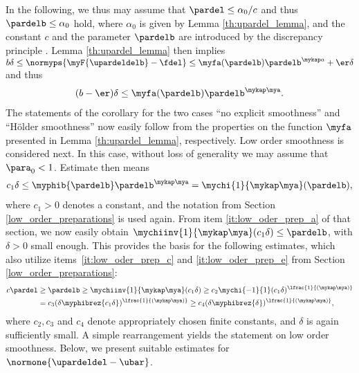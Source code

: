 \documentclass[10pt]{article}
\theoremstyle{definition}
\begin{document}
In the following, we thus may assume that $ \pardel \le \alpha_0/c $
and thus $ \pardelb \le \alpha_0 $ hold, where
$ \alpha_0 $ is given by Lemma \ref{th:upardel_lemma}, and
the constant $ c $ and the parameter $ \pardelb $ are introduced by the discrepancy principle .
Lemma \ref{th:upardel_lemma} then implies
$ b \delta  \le \normyps{\myF{\upardeldelb} - \fdel }
\le \myfa(\pardelb)\pardelb^{\mykap a } + \er \delta $
and thus
%
\begin{align}
(b-\er) \delta  \le \myfa(\pardelb)\pardelb^{\mykap \mya}.
\label{eq:upardel_cor_a}
\end{align}
%
The statements of the corollary for the two cases ``no explicit smoothness''
 and ``H\"older smoothness'' now easily follow from the properties on
the function $\myfa $ presented in Lemma \ref{th:upardel_lemma},
respectively.
Low order smoothness is considered next.
In this case, without loss of generality we may assume that $ \para_0 < 1 $.
Estimate  then means
%
\begin{align*}
c_1 \delta  \le \myphib{\pardelb} \pardelb^{\mykap \mya} = \mychi{1}{\mykap \mya}(\pardelb),
\end{align*}
%
where $ c_1 >0 $ denotes a constant,
and the notation from Section \ref{low_order_preparations} is used again.
From item \ref{it:low_oder_prep_a}
of that section, we now easily obtain
$ \mychiinv{1}{\mykap \mya}(c_1 \delta) \le \pardelb $,
with $ \delta > 0 $ small enough.
%
This provides the basis for the following estimates, which also utilize items~\ref{it:low_oder_prep_c} and \ref{it:low_oder_prep_e} from Section \ref{low_order_preparations}:
%
\begin{align*}
c \pardel & \ge \pardelb \ge \mychiinv{1}{\mykap \mya}(c_1 \delta)
\ge c_2 \mychi{-1}{1}(c_1 \delta)^{\lfrac{1}{(\mykap \mya)}}
\\
& = c_3 (\delta \myphibrez{c_1 \delta})^{\lfrac{1}{(\mykap \mya)}}
\ge c_4 (\delta \myphibrez{\delta})^{\lfrac{1}{(\mykap \mya)}},
\end{align*}
%
where $ c_2, c_3 $ and $ c_4 $ denote appropriately chosen finite constants, and $ \delta $ is again sufficiently small.
A simple rearrangement yields the statement on low order smoothness.
\proofend
%
Below, we present suitable estimates for
$ \normone{\upardeldel - \ubar } $.
\end{document}
